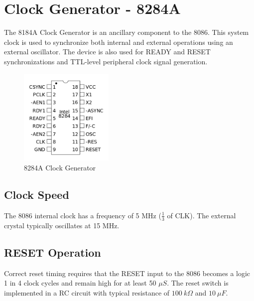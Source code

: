 \section{Clock Generator - 8284A}
The 8184A Clock Generator is an ancillary component to the 8086. This system clock is used to synchronize both internal and external operations using an external oscillator. The device is also used for READY and RESET synchronizations and TTL-level peripheral clock signal generation.

        \begin{figure}[ht]
            \begin{center}
                \includegraphics[width=0.4\textwidth]{figures/8284a.png}
                \caption{8284A Clock Generator} \label{fig:8284a}
            \end{center}
        \end{figure}

    \subsection{Clock Speed}
    The 8086 internal clock has a frequency of 5 MHz ($\frac{1}{3}$ of CLK). The external crystal typically oscillates at 15 MHz.

    \subsection{RESET Operation}
    Correct reset timing requires that the RESET input to the 8086 becomes a logic 1 in 4 clock cycles and remain high for at least 50 $\mu S$. The reset switch is implemented in a RC circuit with typical resistance of $100 \ k\Omega$ and $10 \ \mu F$.
